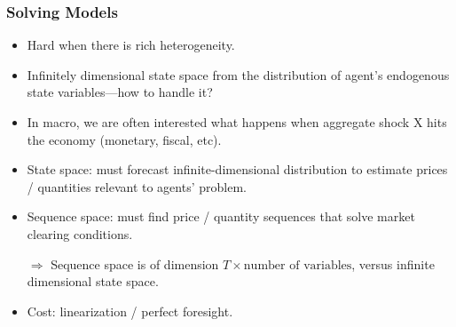 \documentclass[english,xcolor=svgnames]{beamer}
\begin{document}
\begin{frame}
    \frametitle{Solving Models}
    \begin{itemize}
        \item Hard when there is rich heterogeneity.
        \item Infinitely dimensional state space from the distribution of agent's endogenous state variables---how to handle it?
        \item In macro, we are often interested what happens when aggregate shock X hits the economy (monetary, fiscal, etc).
        \item State space: must forecast infinite-dimensional distribution to estimate prices / quantities relevant to agents' problem.
        \item Sequence space: must find price / quantity sequences that solve market clearing conditions.
        \item[$\Rightarrow$] Sequence space is of dimension $T \times \text{number of variables}$, versus infinite dimensional state space. 
       	\item Cost: linearization / perfect foresight.
    \end{itemize}
\end{frame}
\end{document}
